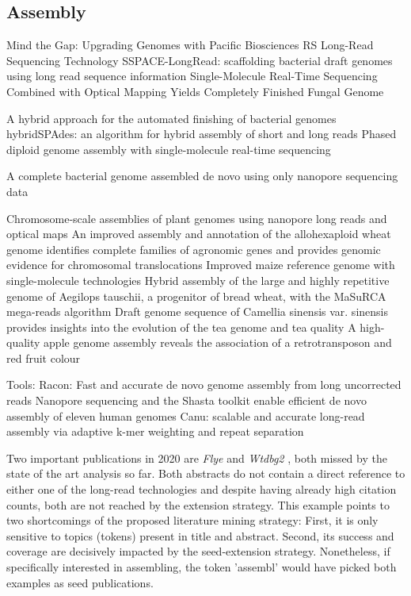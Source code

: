 \subsection{Assembly}
\label{subsec:state_of_art:assembly}

Mind the Gap: Upgrading Genomes with Pacific Biosciences RS Long-Read Sequencing Technology \cite{English2012}
SSPACE-LongRead: scaffolding bacterial draft genomes using long read sequence information \cite{Boetzer2014}
Single-Molecule Real-Time Sequencing Combined with Optical Mapping Yields Completely Finished Fungal Genome \cite{Faino2015}

A hybrid approach for the automated finishing of bacterial genomes \cite{Bashir2012}
hybridSPAdes: an algorithm for hybrid assembly of short and long reads \cite{Antipov2016}
Phased diploid genome assembly with single-molecule real-time sequencing \cite{Chin2016}

A complete bacterial genome assembled de novo using only nanopore sequencing data \cite{Loman2015}

Chromosome-scale assemblies of plant genomes using nanopore long reads and optical maps \cite{Belser2018}
An improved assembly and annotation of the allohexaploid wheat genome identifies complete families of agronomic genes and provides genomic evidence for chromosomal translocations \cite{Clavijo2017}
Improved maize reference genome with single-molecule technologies \cite{Jiao2017}
Hybrid assembly of the large and highly repetitive genome of Aegilops tauschii, a progenitor of bread wheat, with the MaSuRCA mega-reads algorithm \cite{Zimin2017}
Draft genome sequence of Camellia sinensis var. sinensis provides insights into the evolution of the tea genome and tea quality \cite{Wei2018}
A high-quality apple genome assembly reveals the association of a retrotransposon and red fruit colour \cite{Zhang2019}


Tools:
Racon: Fast and accurate de novo genome assembly from long uncorrected reads \cite{Vaser2017}
Nanopore sequencing and the Shasta toolkit enable efficient de novo assembly of eleven human genomes \cite{Shafin2020}
Canu: scalable and accurate long-read assembly via adaptive k-mer weighting and repeat separation \cite{Koren2017}


Two important publications in 2020 are \textit{Flye} \cite{Kolmogorov2019} and \textit{Wtdbg2} \cite{Ruan2020}, both missed by the state of the art analysis so far.
Both abstracts do not contain a direct reference to either one of the long-read technologies and despite having already high citation counts, both are not reached by the extension strategy.
This example points to two shortcomings of the proposed literature mining strategy: First, it is only sensitive to topics (tokens) present in title and abstract.
Second, its success and coverage are decisively impacted by the seed-extension strategy.
Nonetheless, if specifically interested in assembling, the token 'assembl' would have picked both examples as seed publications.


